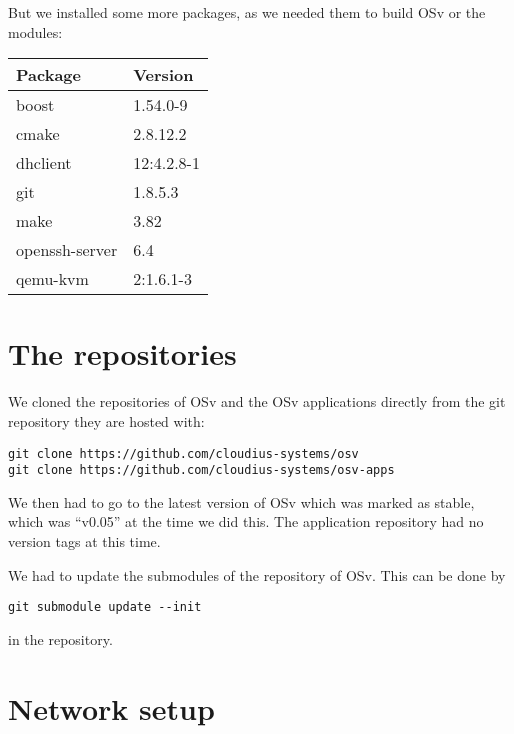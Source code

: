         But we installed some more packages, as we needed them to build OSv or
        the modules:

            \begin{tabular}{ll}
                Package             & Version   \\
                \hline

                boost               & 1.54.0-9  \\
                cmake               & 2.8.12.2  \\
                dhclient            & 12:4.2.8-1 \\
                git                 & 1.8.5.3   \\
                make                & 3.82      \\
                openssh-server      & 6.4       \\
                qemu-kvm            & 2:1.6.1-3 \\
            \end{tabular}

    \section{The repositories}

        We cloned the repositories of OSv and the OSv applications directly from
        the git repository they are hosted with:

\begin{lstlisting}
git clone https://github.com/cloudius-systems/osv
git clone https://github.com/cloudius-systems/osv-apps
\end{lstlisting}

        We then had to go to the latest version of OSv which was marked as
        stable, which was ``v0.05'' at the time we did this. The application
        repository had no version tags at this time.

        We had to update the submodules of the repository of OSv. This can be
        done by

\begin{lstlisting}
git submodule update --init
\end{lstlisting}

        in the repository.

    \section{Network setup}

